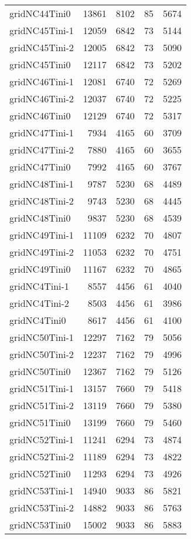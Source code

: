 \begin{longtable}{lrrrr}
gridNC44Tini0 & 13861 & 8102 & 85 & 5674 \\
gridNC45Tini-1 & 12059 & 6842 & 73 & 5144 \\
gridNC45Tini-2 & 12005 & 6842 & 73 & 5090 \\
gridNC45Tini0 & 12117 & 6842 & 73 & 5202 \\
gridNC46Tini-1 & 12081 & 6740 & 72 & 5269 \\
gridNC46Tini-2 & 12037 & 6740 & 72 & 5225 \\
gridNC46Tini0 & 12129 & 6740 & 72 & 5317 \\
gridNC47Tini-1 & 7934 & 4165 & 60 & 3709 \\
gridNC47Tini-2 & 7880 & 4165 & 60 & 3655 \\
gridNC47Tini0 & 7992 & 4165 & 60 & 3767 \\
gridNC48Tini-1 & 9787 & 5230 & 68 & 4489 \\
gridNC48Tini-2 & 9743 & 5230 & 68 & 4445 \\
gridNC48Tini0 & 9837 & 5230 & 68 & 4539 \\
gridNC49Tini-1 & 11109 & 6232 & 70 & 4807 \\
gridNC49Tini-2 & 11053 & 6232 & 70 & 4751 \\
gridNC49Tini0 & 11167 & 6232 & 70 & 4865 \\
gridNC4Tini-1 & 8557 & 4456 & 61 & 4040 \\
gridNC4Tini-2 & 8503 & 4456 & 61 & 3986 \\
gridNC4Tini0 & 8617 & 4456 & 61 & 4100 \\
gridNC50Tini-1 & 12297 & 7162 & 79 & 5056 \\
gridNC50Tini-2 & 12237 & 7162 & 79 & 4996 \\
gridNC50Tini0 & 12367 & 7162 & 79 & 5126 \\
gridNC51Tini-1 & 13157 & 7660 & 79 & 5418 \\
gridNC51Tini-2 & 13119 & 7660 & 79 & 5380 \\
gridNC51Tini0 & 13199 & 7660 & 79 & 5460 \\
gridNC52Tini-1 & 11241 & 6294 & 73 & 4874 \\
gridNC52Tini-2 & 11189 & 6294 & 73 & 4822 \\
gridNC52Tini0 & 11293 & 6294 & 73 & 4926 \\
gridNC53Tini-1 & 14940 & 9033 & 86 & 5821 \\
gridNC53Tini-2 & 14882 & 9033 & 86 & 5763 \\
gridNC53Tini0 & 15002 & 9033 & 86 & 5883 \\

\end{longtable}
